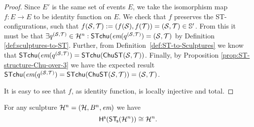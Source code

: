 \begin{proof}
        Since $E'$ is the same set of events $E$, we take the isomorphism map $f: E \rightarrow E$ to be identity function on $E$.
        We check that $f$ preserves the ST-configurations, such that $f(\mathcal{S}, \mathcal{T}):=( f(\mathcal{S}), f(\mathcal{T})) = (\mathcal{S}, \mathcal{T}) \in \mathbb{S}'$. From this it must be that $\exists q^{(\mathcal{S},\mathcal{T})}\in\mathcal{H}^{n}: \mathsf{ST}\mathsf{chu}(\textit{em}(q^{(\mathcal{S},\mathcal{T})}) = (\mathcal{S},\mathcal{T})$ by Definition \ref{def:sculptures-to-ST}. Further, from Definition~\ref{def:ST-to-Sculptures} we know that $\mathsf{ST}\mathsf{chu}(\textit{em}(q^{(\mathcal{S},\mathcal{T})}) = \mathsf{ST}\mathsf{chu}(\mathsf{ChuST}(\mathcal{S},\mathcal{T}))$. Finally, by Proposition \ref{prop:ST-structure-Chu-over-3} we have the expected result $\mathsf{ST}\mathsf{chu}(\textit{em}(q^{(\mathcal{S},\mathcal{T})}) = \mathsf{ST}\mathsf{chu}(\mathsf{ChuST}(\mathcal{S},\mathcal{T})) = (\mathcal{S},\mathcal{T})$.

        It is easy to see that $f$, as identity function, is locally injective and total.
    \end{proof}

    \begin{proposition}
        \label{prop:Sculpture-to-ST}
        For any sculpture $\mathcal{H}^{n}=(\mathcal{H},B^{n},\textit{em})$ we have
        \[
            \mathsf{H}^{\mathsf{s}}(\mathsf{ST}_{\!\mathsf{s}}(\mathcal{H}^{n})) \cong \mathcal{H}^{n}.
        \]
    \end{proposition}

